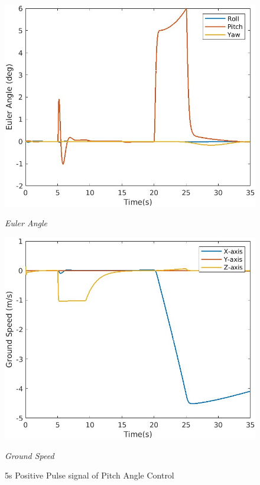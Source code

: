 \begin{figure}[htbp]
  \centering
  \begin{minipage}[b]{0.45\textwidth}
    \centering
    \includegraphics[width=\textwidth]{Images/Attitude Control Plot/1 EulerAngle4.jpg}
    \caption*{\textit{Euler Angle}}
  \end{minipage}
  \hfil
  \begin{minipage}[b]{0.45\textwidth}
    \centering
    \includegraphics[width=\textwidth]{Images/Attitude Control Plot/2 groundspeed_4.jpg}
    \caption*{\textit{Ground Speed}}
  \end{minipage}
  \caption{5s Positive Pulse signal of Pitch Angle Control}
  \label{fig:attitude control pitch}
\end{figure}

